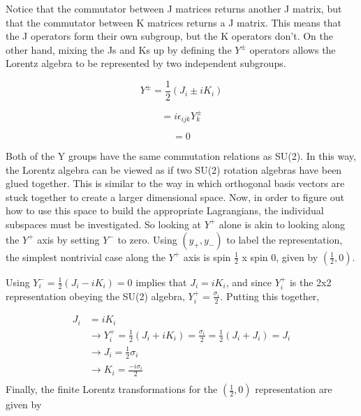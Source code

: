 Notice that the commutator between J matrices returns another J matrix, but that the commutator between K matrices returns a J matrix. This means that the J operators form their own subgroup, but the K operators don't. On the other hand, mixing the Js and Ks up by defining the $Y^{\pm}$ operators allows the Lorentz algebra to be represented by two independent subgroups. 

\begin{equation}
Y^{\pm} = \frac{1}{2}(J_i \pm iK_i)
\end{equation}

\begin{equation}
[Y^{\pm}_i, Y^{\pm}_j] = i\epsilon_{ijk}Y^{\pm}_k
\end{equation}

\begin{equation}
[Y^{\pm}_i, Y^{\mp}_j] = 0
\end{equation}

Both of the Y groups have the same commutation relations as SU(2). In this way, the Lorentz algebra can be viewed as if two SU(2) rotation algebras have been glued together. This is similar to the way in which orthogonal basis vectors are stuck together to create a larger dimensional space. Now, in order to figure out how to use this space to build the appropriate Lagrangians, the individual subspaces must be investigated. So looking at $Y^{+}$ alone is akin to looking along the $Y^{+}$ axis by setting $Y^{-}$ to zero. Using $(y_+, y_-)$ to label the representation, the simplest nontrivial case along the $Y^{+}$ axis is spin $\frac{1}{2}$ x spin 0, given by $(\frac{1}{2}, 0)$.   

Using $Y_{i}^{-} = \frac{1}{2}(J_i - iK_i) = 0$ implies that $J_i = iK_i$, and since $Y_{i}^{+}$ is the 2x2 representation obeying the SU(2) algebra, $Y_{i}^{+} = \frac{\sigma_i}{2}$. Putting this together,

\begin{equation}
\begin{split}
J_i &= iK_i \\ 
&\rightarrow Y^+_i = \frac{1}{2}(J_i + iK_i) = \frac{\sigma_i}{2} = \frac{1}{2}(J_i + J_i) = J_i \\
&\rightarrow J_i = \frac{1}{2}\sigma_i \\
&\rightarrow K_i = \frac{-i\sigma_i}{2} \\
\end{split}
\end{equation} 
Finally, the finite Lorentz transformations for the $(\frac{1}{2}, 0)$ representation are given by 


